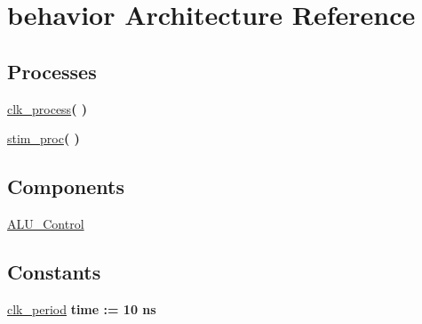 \hypertarget{class_a_l_u___control__tb_1_1behavior}{\section{behavior \-Architecture \-Reference}
\label{class_a_l_u___control__tb_1_1behavior}
}
\*
\*
\subsection*{\-Processes}
 \begin{DoxyCompactItemize}
\item 
\hypertarget{class_a_l_u___control__tb_1_1behavior_ac5bb218131b813f7908ec89476b31fca}{\hyperlink{class_a_l_u___control__tb_1_1behavior_ac5bb218131b813f7908ec89476b31fca}{clk\-\_\-process}{\bfseries  (  )}}\label{class_a_l_u___control__tb_1_1behavior_ac5bb218131b813f7908ec89476b31fca}

\item 
\hypertarget{class_a_l_u___control__tb_1_1behavior_ad2efa6785cff833c341e27596b21aeb5}{\hyperlink{class_a_l_u___control__tb_1_1behavior_ad2efa6785cff833c341e27596b21aeb5}{stim\-\_\-proc}{\bfseries  (  )}}\label{class_a_l_u___control__tb_1_1behavior_ad2efa6785cff833c341e27596b21aeb5}

\end{DoxyCompactItemize}
\subsection*{\-Components}
 \begin{DoxyCompactItemize}
\item 
\hypertarget{class_a_l_u___control__tb_1_1behavior_abf60193336988d744deadd38bbf9d27a}{\hyperlink{class_a_l_u___control__tb_1_1behavior_abf60193336988d744deadd38bbf9d27a}{\-A\-L\-U\-\_\-\-Control}  {\bfseries }  }\label{class_a_l_u___control__tb_1_1behavior_abf60193336988d744deadd38bbf9d27a}

\end{DoxyCompactItemize}
\subsection*{\-Constants}
 \begin{DoxyCompactItemize}
\item 
\hypertarget{class_a_l_u___control__tb_1_1behavior_a8a175a7f832828463d31be056e0be9a5}{\hyperlink{class_a_l_u___control__tb_1_1behavior_a8a175a7f832828463d31be056e0be9a5}{clk\-\_\-period} {\bfseries time  \-:=  10  ns } }\label{class_a_l_u___control__tb_1_1behavior_a8a175a7f832828463d31be056e0be9a5}

\end{DoxyCompactItemize}
